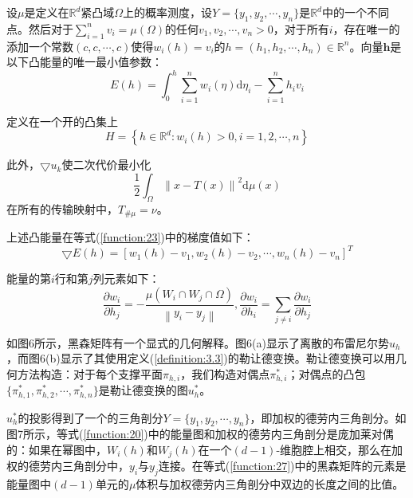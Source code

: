 \begin{theorem}[参考文献【6】]\label{theorem:4.2}
	设$\mu$是定义在$\mathbb{R}^d$紧凸域$\Omega$上的概率测度，设$Y=\{ y_1,y_2,\cdots, y_n \}$是$\mathbb{R}^d$中的一个不同点。然后对于$\sum_{i=1}^n v_i=\mu(\Omega)$的任何$v_1,v_2,\cdots, v_n>0$，对于所有$i$，存在唯一的添加一个常数$(c,c,\cdots,c)$使得$w_i(h)=v_i$的$h=(h_1,h_2,\cdots, h_n)\in \mathbb{R}^n$。向量$\mathbf{h}$是以下凸能量的唯一最小值参数：
	\begin{equation}
		E(h) =\int_0^h \sum_{i=1}^n w_i(\eta)\mathrm{d}\eta_i  - \sum_{i=1}^n h_iv_i
		\label{function:23}
	\end{equation}

	定义在一个开的凸集上
	\begin{equation}
		H=\left \{ h\in \mathbb{R}^d : w_i(h)>0,i=1,2,\cdots ,n  \right \} 
		\label{function:24}
	\end{equation}

	此外，$\bigtriangledown u_k$使二次代价最小化
	\begin{equation}
		\frac{1}{2} \int_{\Omega} \left \| x-T(x) \right \|^2 \mathrm{d}\mu(x)
		\label{function:25}
	\end{equation}
	在所有的传输映射中，$T_{\# \mu} = \nu$。
	
	上述凸能量在等式(\ref{function:23})中的梯度值如下：
	\begin{equation}
		\bigtriangledown E(h)=\left [ w_1(h)-v_1, w_2(h)-v_2, \cdots , w_n(h)-v_n \right ]^T
		\label{function:26}
	\end{equation}

	能量的第$i$行和第$j$列元素如下：
	\begin{equation}
		\frac{\partial w_i}{\partial h_j} =-\frac{\mu (W_i \cap W_j \cap \Omega)}{\left \| y_i-y_j \right \| }, \frac{\partial w_i}{\partial h_i} = \sum_{j\ne i}\frac{\partial w_i}{\partial h_j} 
		\label{function:27}
	\end{equation}

	如图6所示，黑森矩阵有一个显式的几何解释。图6(a)显示了离散的布雷尼尔势$u_h$，而图6(b)显示了其使用定义(\ref{definition:3.3})的勒让德变换。勒让德变换可以用几何方法构造：对于每个支撑平面$\pi_{h,i}$，我们构造对偶点$\pi_{h,i}^*$；对偶点的凸包$\{\pi_{h,1}^* ,\pi_{h,2}^* , \cdots , \pi_{h,n}^* \}$是勒让德变换的图$u_h^*$。
	
	$u_h^*$的投影得到了一个的三角剖分$Y=\{ y_1,y_2, \cdots ,y_n \}$，即加权的德劳内三角剖分。如图7所示，等式(\ref{function:20})中的能量图和加权的德劳内三角剖分是庞加莱对偶的：如果在幂图中，$W_i(h)$和$W_j(h)$在一个$(d-1)$-维胞腔上相交，那么在加权的德劳内三角剖分中，$y_i$与$y_j$连接。在等式(\ref{function:27})中的黑森矩阵的元素是能量图中$(d-1)$单元的$\mu$体积与加权德劳内三角剖分中双边的长度之间的比值。
\end{theorem}

